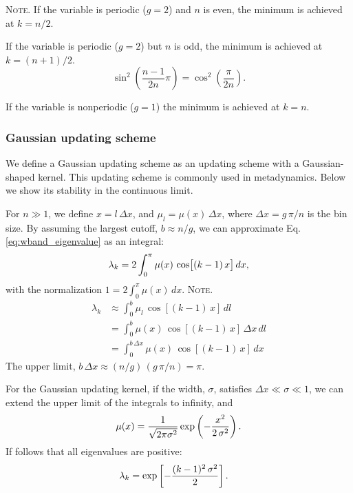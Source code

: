 \documentclass[reprint, superscriptaddress, floatfix]{revtex4-1}
\newcommand{\note}[1]{{\color{DarkGreen}\footnotesize \textsc{Note.} #1}}
\begin{document}
\note{
If the variable is periodic ($g = 2$) and $n$ is even,
the minimum is achieved at $k = n/2$.

If the variable is periodic ($g = 2$) but $n$ is odd,
the minimum is achieved at $k = (n+1)/2$.
$$
\sin^2\left(
  \frac{n-1}{2n} \pi
\right)
=
\cos^2\left(
  \frac{\pi}{2n}
\right)
.
$$

If the variable is nonperiodic ($g = 1$)
the minimum is achieved at $k = n$.
}





\subsubsection{Gaussian updating scheme}



We define a Gaussian updating scheme
as an updating scheme with a
Gaussian-shaped kernel.
%
This updating scheme is commonly
used in metadynamics.
%
Below we show its stability
in the continuous limit.



For $n \gg 1$,
we define
$x = l \, \Delta x$,
and
$\mu_l = \mu(x) \, \Delta x$,
where
$\Delta x = g \, \pi/n$
is the bin size.
%
By assuming the largest cutoff, $b \approx n/g$,
we can approximate Eq. \eqref{eq:wband_eigenvalue}
as an integral:
%
\begin{equation}
  \lambda_k
  =
  2 \int_0^\pi
    \mu(x) \, \cos \bigl[ (k-1) \, x \bigr] \, dx,
\notag
\end{equation}
%
with the normalization
%
$
  1 = 2 \int_0^\pi \mu(x) \, dx.
$
\note{
\begin{align*}
  \lambda_k
  &\approx
  \int_0^b \mu_l \, \cos[(k-1) \, x] \, dl
  \\
  &=
  \int_0^b \mu(x) \, \cos[(k-1) \, x] \, \Delta x \, dl
  \\
  &=
  \int_0^{b \, \Delta x} \mu(x) \, \cos[(k-1) \, x] \, dx
\end{align*}
The upper limit,
$b \, \Delta x \approx (n/g) \, (g\,\pi/n) = \pi$.
}

For the Gaussian updating kernel,
if the width, $\sigma$, satisfies $\Delta x \ll \sigma \ll 1$,
we can extend
the upper limit of the integrals
to infinity, and
%
\begin{equation}
  \mu(x)
  =
  \frac{            1            }
       { \sqrt{ 2 \pi \sigma^2 } }
  \exp\left(
        -\frac{       x^2     }
              { 2 \, \sigma^2 }
      \right)
  .
\notag
\end{equation}
%
%
If follows that all eigenvalues are positive\cite{bussi2006}:
%
\begin{align}
  \lambda_k
  &=
  \exp\left[
        -\frac{ (k - 1)^2 \, \sigma^2 }
              {           2           }
      \right]
  .
\notag
\end{align}
\end{document}
